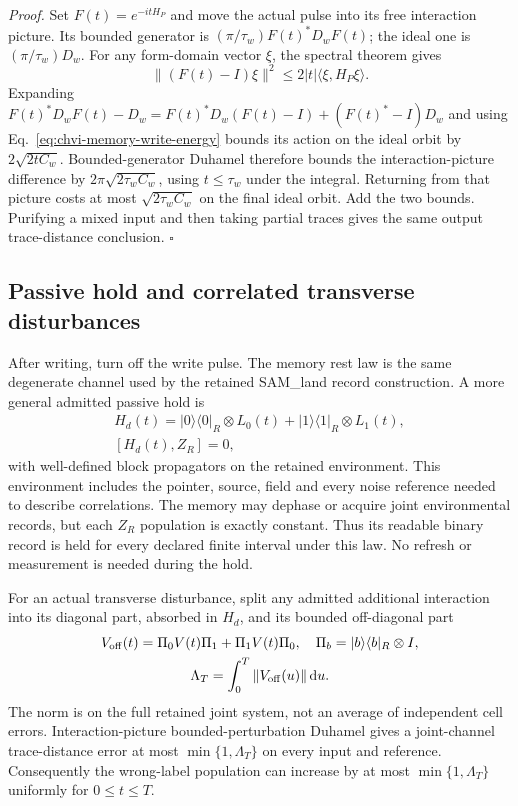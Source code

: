\emph{Proof.} Set $F(t)=e^{-itH_P}$ and move the actual pulse into its
free interaction picture. Its bounded generator is
$(\pi/\tau_w)F(t)^*D_wF(t)$; the ideal one is
$(\pi/\tau_w)D_w$. For any form-domain vector $\xi$, the spectral theorem
gives
\begin{equation}
 \|(F(t)-I)\xi\|^2\leq2|t|\langle\xi,H_P\xi\rangle.
\end{equation}
Expanding
$F(t)^*D_wF(t)-D_w
 =F(t)^*D_w(F(t)-I)+(F(t)^*-I)D_w$ and using
Eq.~\eqref{eq:chvi-memory-write-energy} bounds its action on the ideal
orbit by $2\sqrt{2tC_w}$. Bounded-generator Duhamel therefore bounds
the interaction-picture difference by
$2\pi\sqrt{2\tau_wC_w}$, using $t\leq\tau_w$ under the integral.
Returning from that picture costs at most
$\sqrt{2\tau_wC_w}$ on the final ideal orbit. Add the two bounds.
Purifying a mixed input and then taking partial traces gives the same
output trace-distance conclusion. $\square$

\subsection{Passive hold and correlated transverse disturbances}

After writing, turn off the write pulse. The memory rest law is the same
degenerate channel used by the retained SAM\_land record construction.
A more general admitted passive hold is
\begin{equation}
\begin{gathered}
H_d(t)=|0\rangle\langle0|_R\otimes L_0(t)
       +|1\rangle\langle1|_R\otimes L_1(t),
 \\
 [H_d(t),Z_R]=0,
\end{gathered}
\label{eq:chvi-memory-diagonal-hold}
\end{equation}
with well-defined block propagators on the retained environment. This
environment includes the pointer, source, field and every noise reference
needed to describe correlations. The memory may dephase or acquire joint
environmental records, but each $Z_R$ population is exactly constant.
Thus its readable binary record is held for every declared finite interval
under this law. No refresh or measurement is needed during the hold.

For an actual transverse disturbance, split any admitted additional
interaction into its diagonal part, absorbed in $H_d$, and its bounded
off-diagonal part
\begin{equation}
\begin{gathered}
V_{\rm off}(t)=\Pi_0V(t)\Pi_1+\Pi_1V(t)\Pi_0,
 \quad \Pi_b=|b\rangle\langle b|_R\otimes I,
 \\
 \Lambda_T=\int_0^T\|V_{\rm off}(u)\|\,\mathrm du.
\end{gathered}
\label{eq:chvi-memory-hold-exposure}
\end{equation}
The norm is on the full retained joint system, not an average of independent
cell errors. Interaction-picture bounded-perturbation Duhamel gives a
joint-channel trace-distance error at most $\min\{1,\Lambda_T\}$ on every
input and reference. Consequently the wrong-label population can increase
by at most $\min\{1,\Lambda_T\}$ uniformly for $0\leq t\leq T$.

